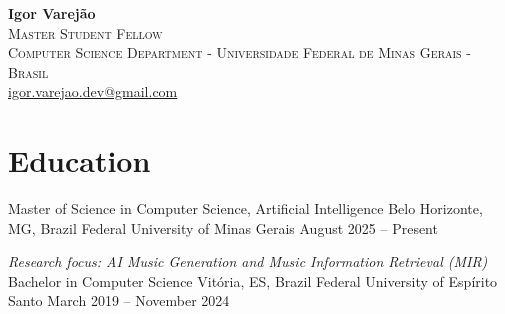 

\newcommand{\columnindustry}[5]{
  \vspace{-2pt}
  \item
  \textbullet\ \textbf{#1} \\
  \textit{\small #2} \\
  \textit{\small #3} \\
  \textit{\small #4} \\
  \begin{itemize}[leftmargin=*, topsep=1pt, itemsep=0pt, parsep=0pt]
    \item #5
  \end{itemize}
}
\newcommand{\columnresearch}[3]{
  \vspace{-2pt}
  \textbf{#1} \\
  \textit{\small #2} \\
  \begin{itemize}[leftmargin=*, topsep=1pt, itemsep=0pt, parsep=0pt]
    \item #3
  \end{itemize}
}


\small
\linespread{1.04}\selectfont

\begin{center}
  {\LARGE \textbf{Igor Varejão}} \\
  \textsc{Master Student Fellow} \\
  \textsc{Computer Science Department - Universidade Federal de Minas Gerais - Brasil} \\
  \href{mailto:igor.varejao.dev@gmail.com}{igor.varejao.dev@gmail.com}
\end{center}

\section{Education}
\liststart
\education
  {Master of Science in Computer Science, Artificial Intelligence}
  {Belo Horizonte, MG, Brazil}
  {Federal University of Minas Gerais}
  {August 2025 -- Present}
  \vspace{-5pt}
  \item \textit{Research focus: AI Music Generation and Music Information Retrieval (MIR)}
\education
  {Bachelor in Computer Science}
  {Vitória, ES, Brazil}
  {Federal University of Espírito Santo}
  {March 2019 -- November 2024}
\listend

